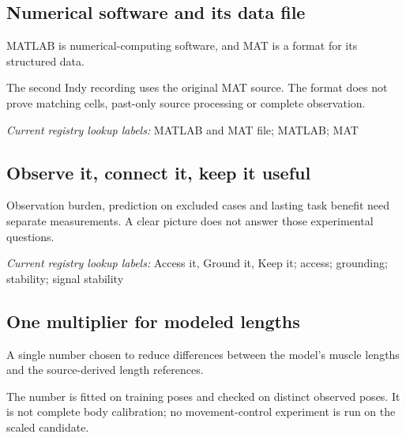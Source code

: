\begin{samepage}
\subsection*{Numerical software and its data file}
\noindent MATLAB is numerical-computing software, and MAT is a format for its structured data.\par
\end{samepage}
\begin{samepage}
\noindent The second Indy recording uses the original MAT source. The format does not prove matching cells, past-only source processing or complete observation.\par\nopagebreak[4]

\end{samepage}


\noindent\textit{Current registry lookup labels:} MATLAB and MAT file; MATLAB; MAT\par

\begin{samepage}
\subsection*{Observe it, connect it, keep it useful}
\noindent Observation burden, prediction on excluded cases and lasting task benefit need separate measurements. A clear picture does not answer those experimental questions.\par\nopagebreak[4]

\end{samepage}


\noindent\textit{Current registry lookup labels:} Access it, Ground it, Keep it; access; grounding; stability; signal stability\par

\begin{samepage}
\subsection*{One multiplier for modeled lengths}
\noindent A single number chosen to reduce differences between the model’s muscle lengths and the source-derived length references.\par
\end{samepage}
\begin{samepage}
\noindent The number is fitted on training poses and checked on distinct observed poses. It is not complete body calibration; no movement-control experiment is run on the scaled candidate.\par\nopagebreak[4]

\end{samepage}


